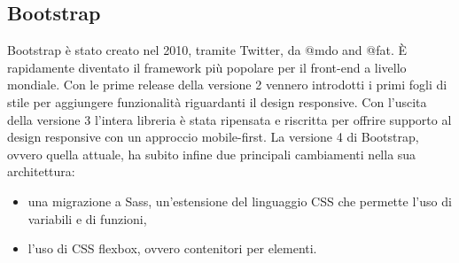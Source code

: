 \subsection{Bootstrap}

Bootstrap è stato creato nel 2010, tramite Twitter, da @mdo and @fat. È rapidamente diventato il framework più popolare per il front-end a livello mondiale. Con le prime release della versione 2 vennero introdotti i primi fogli di stile per aggiungere funzionalità riguardanti il design responsive. Con l'uscita della versione 3 l'intera libreria è stata ripensata e riscritta per offrire supporto al design responsive con un approccio mobile-first. La versione 4 di Bootstrap, ovvero quella attuale, ha subito infine due principali cambiamenti nella sua architettura:
\begin{itemize}
    \item una migrazione a Sass, un'estensione del linguaggio CSS che permette l'uso di variabili e di funzioni,
    \item l'uso di CSS flexbox, ovvero contenitori per elementi.
\end{itemize}

